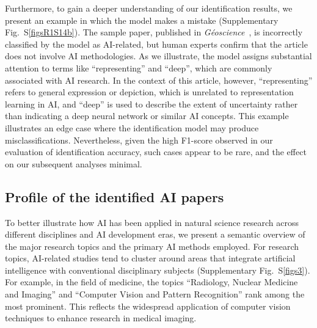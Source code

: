 Furthermore, to gain a deeper understanding of our identification results, we present an example in which the model makes a mistake (Supplementary Fig.~S\ref{figsR1S14b}).
The sample paper, published in \textit{Géoscience}~\supercite{kandlikar2005representing}, is incorrectly classified by the model as AI-related, but human experts confirm that the article does not involve AI methodologies.
As we illustrate, the model assigns substantial attention to terms like “representing” and “deep”, which are commonly associated with AI research.
In the context of this article, however, “representing” refers to general expression or depiction, which is unrelated to representation learning in AI, and “deep” is used to describe the extent of uncertainty rather than indicating a deep neural network or similar AI concepts.
This example illustrates an edge case where the identification model may produce misclassifications.
Nevertheless, given the high F1-score observed in our evaluation of identification accuracy, such cases appear to be rare, and the effect on our subsequent analyses minimal.


\subsection{Profile of the identified AI papers}
\label{Profile of the identified AI papers}
To better illustrate how AI has been applied in natural science research across different disciplines and AI development eras, we present a semantic overview of the major research topics and the primary AI methods employed.
For research topics, AI-related studies tend to cluster around areas that integrate artificial intelligence with conventional disciplinary subjects (Supplementary Fig.~S\ref{figs3}).
For example, in the field of medicine, the topics “Radiology, Nuclear Medicine and Imaging” and “Computer Vision and Pattern Recognition” rank among the most prominent. This reflects the widespread application of computer vision techniques to enhance research in medical imaging.

